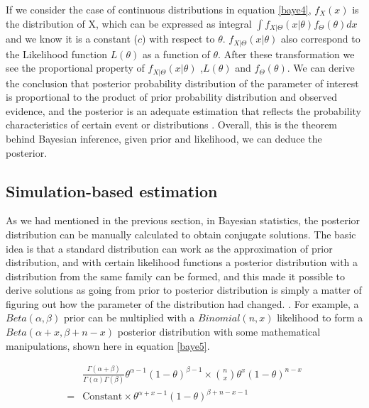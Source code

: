 If we consider the case of continuous distributions in equation \ref{baye4}, $f_X(x)$ is the distribution of X, which can be expressed as integral $\int f_{X|\Theta}(x|\theta) f_\Theta(\theta) dx$ and we know it is a constant ($c$) with respect to $\theta$. $f_{X|\Theta}(x|\theta)$ also correspond to the Likelihood function $L(\theta)$ as a function of $\theta$. After these transformation we see the proportional property of $f_{X|\Theta}(x|\theta)$ ,$L(\theta)$ and $f_\Theta(\theta)$. We can derive the conclusion that posterior probability distribution of the parameter of interest is proportional to the product of prior probability distribution and observed evidence, and the posterior is an adequate estimation that reflects the probability characteristics of certain event or distributions \citep{Wong19}. Overall, this is the theorem behind Bayesian inference, given prior and likelihood, we can deduce the posterior. 

\subsection{Simulation-based estimation}

As we had mentioned in the previous section, in Bayesian statistics, the posterior distribution can be manually calculated to obtain conjugate solutions. The basic idea is that a standard distribution can work as the approximation of prior distribution, and with certain likelihood functions a posterior distribution with a distribution from the same family can be formed, and this made it possible to derive solutions as going from prior to posterior distribution is simply a matter of figuring out how the parameter of the distribution had changed. \citep{Wong19}. For example, a $Beta(\alpha,\beta)$ prior can be multiplied with a $Binomial(n,x)$ likelihood to form a $Beta(\alpha + x,\beta+n - x)$ posterior distribution with some mathematical manipulations, shown here in equation \ref{baye5}. 

\begin{equation} \label{baye5}
\begin{aligned}
& \frac{\Gamma(\alpha+\beta)}{\Gamma(\alpha)\Gamma(\beta)}\theta^{\alpha-1}(1-\theta)^{\beta-1} \times {n \choose x}\theta^x(1-\theta)^{n-x}\\
=& \text{Constant}\times\theta^{\alpha+x-1}(1-\theta)^{\beta+n-x-1}
\end{aligned}
\end{equation}

